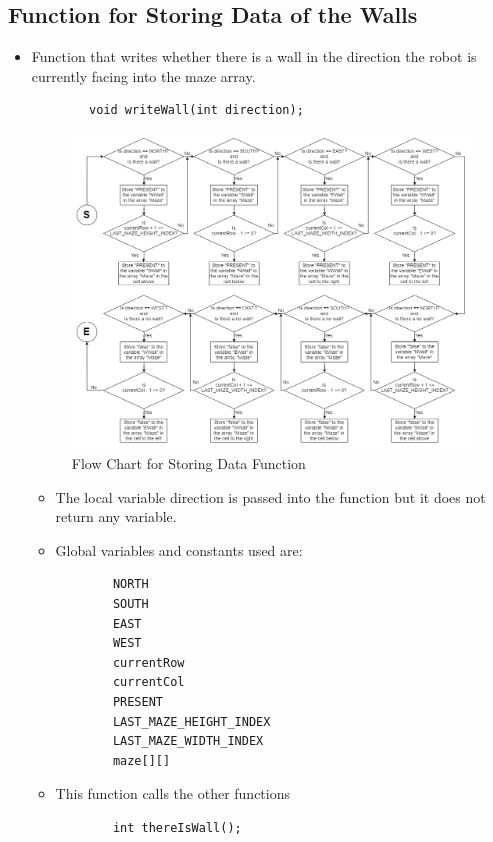 \documentclass[11pt]{article}
\begin{document}
\subsection{Function for Storing Data of the Walls}
\begin{itemize}
\item Function that writes whether there is a wall in the direction the robot is currently facing into the maze array.
	\begin{verbatim}
		void writeWall(int direction);
	\end{verbatim}
\begin{figure}[htp]
\centering
\includegraphics[scale=0.4]{images/Software_Flowchart/writeWall.png}
\caption{Flow Chart for Storing Data Function}
\label{}
\end{figure}
	\begin{itemize}
	\item The local variable direction is passed into the function but it does not return any variable.
	\item Global variables and constants used are:
	\begin{verbatim}
		NORTH
		SOUTH
		EAST
		WEST
		currentRow
		currentCol
		PRESENT
		LAST_MAZE_HEIGHT_INDEX
		LAST_MAZE_WIDTH_INDEX
		maze[][]
	\end{verbatim}
	\item This function calls the other functions 
	\begin{verbatim}
		int thereIsWall();
	\end{verbatim}
	\end{itemize}
\end{itemize}
\newpage
\end{document}
